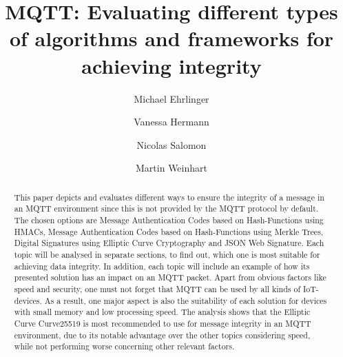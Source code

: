 \documentclass[runningheads]{llncs}
\begin{document}
\title{MQTT: Evaluating different types of algorithms and frameworks for achieving integrity}


\author{Michael Ehrlinger \and Vanessa Hermann \and Nicolas Salomon \and Martin Weinhart}



\maketitle


\begin{abstract}
This paper depicts and evaluates different ways to ensure the integrity of a message in an MQTT environment since this is not provided by the MQTT protocol by default. 
The chosen options are Message Authentication Codes based on Hash-Functions using HMACs, Message Authentication Codes based on Hash-Functions using Merkle Trees, Digital Signatures using Elliptic Curve Cryptography and JSON Web Signature. 
Each topic will be analysed in separate sections, to find out, which one is most suitable for achieving data integrity. 
In addition, each topic will include an example of how its presented solution has an impact on an MQTT packet. 
Apart from obvious factors like speed and security, one must not forget that MQTT can be used by all kinds of IoT-devices. 
As a result, one major aspect is also the suitability of each solution for devices with small memory and low processing speed. 
The analysis shows that the Elliptic Curve Curve25519 is most recommended to use for message integrity in an MQTT environment, due to its notable advantage over the other topics considering speed, while not performing worse concerning other relevant factors.
\newline

\end{abstract}



\newpage








%
%
\newpage



\end{document}
